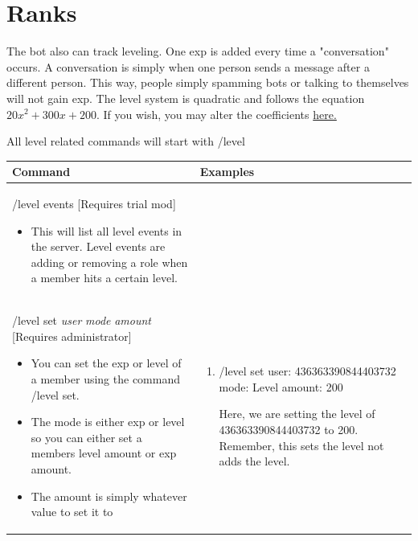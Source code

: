 \documentclass{scrartcl}
\begin{document}
\section{Ranks} 
The bot also can track leveling. One exp is added every time a "conversation" occurs. A conversation is simply when one person sends a message after a different person. This way, people simply spamming bots or talking to themselves will not gain exp. The level system is quadratic and follows the equation $20x^2+300x+200.$ If you wish, you may alter the coefficients \href{https://github.com/Bryli06/KusanaliBot/blob/main/core/calculate_level.py}{here.}

All level related commands will start with /level

\begin{tabularx}{\textwidth}{|>{\raggedright\arraybackslash}X|>{\raggedright\arraybackslash}X|}
\hline 
Command & Examples\\
\hline
/level events [Requires trial mod]
\begin{itemize}
    \item This will list all level events in the server. Level events are adding or removing a role when a member hits a certain level.
\end{itemize}
&
\begin{enumerate}
    
\end{enumerate}\\
\hline
/level set \textit{user} \textit{mode} \textit{amount} [Requires administrator]
\begin{itemize}
    \item You can set the exp or level of a member using the command /level set.
    \item The mode is either exp or level so you can either set a members level amount or exp amount.
    \item The amount is simply whatever value to set it to
\end{itemize}
&
\begin{enumerate}
    \item /level set user: \color{gray} 436363390844403732 \color{black} mode: \color{gray}Level \color{black} amount: \color{gray} 200 \color{black}
    
    Here, we are setting the level of 436363390844403732 to 200. Remember, this sets the level not adds the level. 
\end{enumerate}\\
\hline

\end{tabularx}
\newpage
\end{document}
